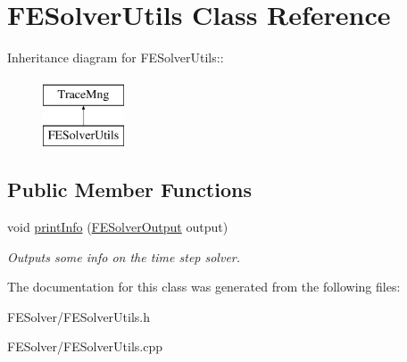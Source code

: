 \hypertarget{classFESolverUtils}{
\section{FESolverUtils Class Reference}
\label{classFESolverUtils}
}
Inheritance diagram for FESolverUtils::\begin{figure}[H]
\begin{center}
\leavevmode
\includegraphics[height=2cm]{classFESolverUtils}
\end{center}
\end{figure}
\subsection*{Public Member Functions}
\begin{DoxyCompactItemize}
\item 
\hypertarget{classFESolverUtils_a7a97d0b724004bed7df58855607c25fe}{
void \hyperlink{classFESolverUtils_a7a97d0b724004bed7df58855607c25fe}{printInfo} (\hyperlink{classFESolverOutput}{FESolverOutput} output)}
\label{classFESolverUtils_a7a97d0b724004bed7df58855607c25fe}

\begin{DoxyCompactList}\small\item\em Outputs some info on the time step solver. \item\end{DoxyCompactList}\end{DoxyCompactItemize}


The documentation for this class was generated from the following files:\begin{DoxyCompactItemize}
\item 
FESolver/FESolverUtils.h\item 
FESolver/FESolverUtils.cpp\end{DoxyCompactItemize}
